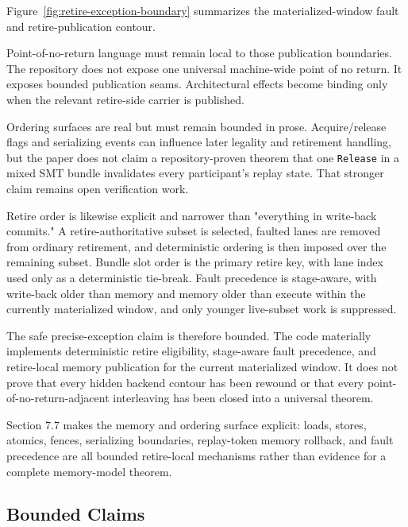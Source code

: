\documentclass[twocolumn]{article}
\begin{document}
Figure~\ref{fig:retire-exception-boundary} summarizes the materialized-window fault and retire-publication contour.



Point-of-no-return language must remain local to those publication boundaries. The repository does not expose one universal machine-wide point of no return. It exposes bounded publication seams. Architectural effects become binding only when the relevant retire-side carrier is published.

Ordering surfaces are real but must remain bounded in prose. Acquire/release flags and serializing events can influence later legality and retirement handling, but the paper does not claim a repository-proven theorem that one \texttt{Release} in a mixed SMT bundle invalidates every participant's replay state. That stronger claim remains open verification work.

Retire order is likewise explicit and narrower than "everything in write-back commits." A retire-authoritative subset is selected, faulted lanes are removed from ordinary retirement, and deterministic ordering is then imposed over the remaining subset. Bundle slot order is the primary retire key, with lane index used only as a deterministic tie-break. Fault precedence is stage-aware, with write-back older than memory and memory older than execute within the currently materialized window, and only younger live-subset work is suppressed.

The safe precise-exception claim is therefore bounded. The code materially implements deterministic retire eligibility, stage-aware fault precedence, and retire-local memory publication for the current materialized window. It does not prove that every hidden backend contour has been rewound or that every point-of-no-return-adjacent interleaving has been closed into a universal theorem.

Section 7.7 makes the memory and ordering surface explicit: loads, stores, atomics, fences, serializing boundaries, replay-token memory rollback, and fault precedence are all bounded retire-local mechanisms rather than evidence for a complete memory-model theorem.


\subsection{Bounded Claims}
\end{document}
